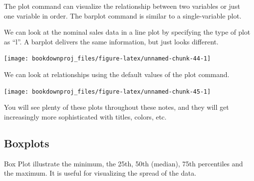 \documentclass[
]{book}
\newenvironment{Shaded}{\begin{snugshade}}{\end{snugshade}}
\newcommand{\AttributeTok}[1]{\textcolor[rgb]{0.77,0.63,0.00}{#1}}
\newcommand{\DecValTok}[1]{\textcolor[rgb]{0.00,0.00,0.81}{#1}}
\newcommand{\FunctionTok}[1]{\textcolor[rgb]{0.00,0.00,0.00}{#1}}
\newcommand{\NormalTok}[1]{#1}
\newcommand{\SpecialCharTok}[1]{\textcolor[rgb]{0.00,0.00,0.00}{#1}}
\newcommand{\StringTok}[1]{\textcolor[rgb]{0.31,0.60,0.02}{#1}}
\begin{document}
The plot command can visualize the relationship between two variables or just one variable in order. The barplot command is similar to a single-variable plot.

We can look at the nominal sales data in a line plot by specifying the type of plot as ``l''. A barplot delivers the same information, but just looks different.

\begin{Shaded}
\end{Shaded}

\begin{center}\texttt{[image: bookdownproj\_files/figure-latex/unnamed-chunk-44-1]} \end{center}

We can look at relationships using the default values of the plot command.

\begin{Shaded}
\end{Shaded}

\begin{center}\texttt{[image: bookdownproj\_files/figure-latex/unnamed-chunk-45-1]} \end{center}

You will see plenty of these plots throughout these notes, and they will get increasingly more sophisticated with titles, colors, etc.

\hypertarget{boxplots}{%
\subsection{Boxplots}\label{boxplots}}

Box Plot illustrate the minimum, the 25th, 50th (median), 75th percentiles and the maximum. It is useful for visualizing the spread of the data.

\begin{Shaded}
\end{Shaded}
\end{document}
